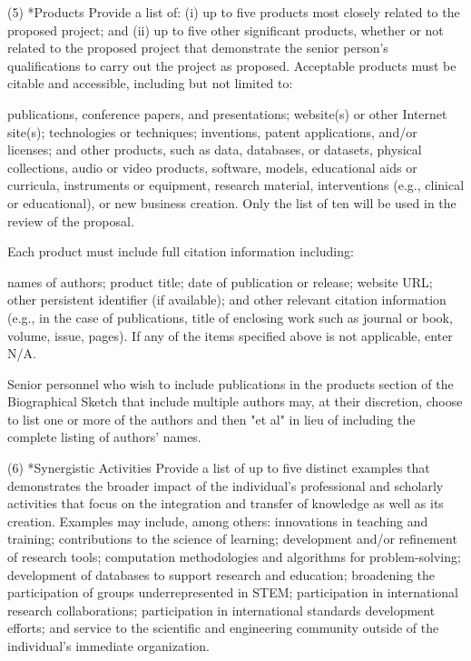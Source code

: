 {(5) *Products
Provide a list of: (i) up to five products most closely related to the proposed project; and (ii) up to five other significant products, whether or not related to the proposed project that demonstrate the senior person’s qualifications to carry out the project as proposed. Acceptable products must be citable and accessible, including but not limited to:

publications, conference papers, and presentations;
website(s) or other Internet site(s);
technologies or techniques;
inventions, patent applications, and/or licenses; and
other products, such as data, databases, or datasets, physical collections, audio or video products, software, models, educational aids or curricula, instruments or equipment, research material, interventions (e.g., clinical or educational), or new business creation.
Only the list of ten will be used in the review of the proposal.

Each product must include full citation information including:

names of authors;
product title;
date of publication or release;
website URL;
other persistent identifier (if available); and
other relevant citation information (e.g., in the case of publications, title of enclosing work such as journal or book, volume, issue, pages).
If any of the items specified above is not applicable, enter N/A.

Senior personnel who wish to include publications in the products section of the Biographical Sketch that include multiple authors may, at their discretion, choose to list one or more of the authors and then "et al" in lieu of including the complete listing of authors' names.

(6) *Synergistic Activities
Provide a list of up to five distinct examples that demonstrates the broader impact of the individual’s professional and scholarly activities that focus on the integration and transfer of knowledge as well as its creation. Examples may include, among others: innovations in teaching and training; contributions to the science of learning; development and/or refinement of research tools; computation methodologies and algorithms for problem-solving; development of databases to support research and education; broadening the participation of groups underrepresented in STEM; participation in international research collaborations; participation in international standards development efforts; and service to the scientific and engineering community outside of the individual’s immediate organization.

}
